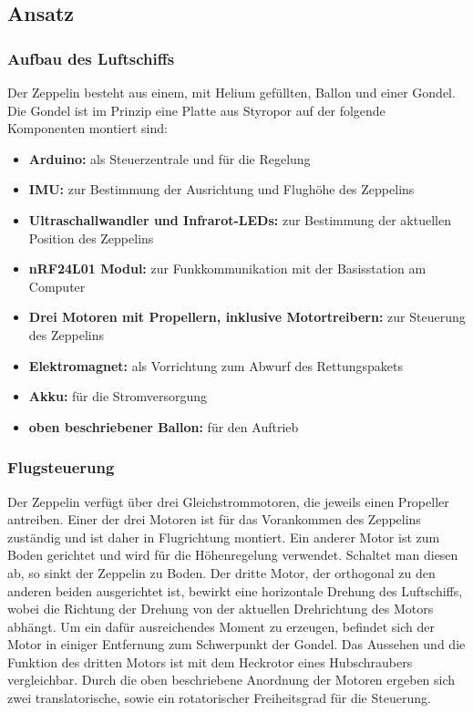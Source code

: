 \documentclass[lang=ngerman,inputenc=utf8,fontsize=10pt]{ldvarticle}
\begin{document}
\subsection*{Ansatz}
\subsubsection*{Aufbau des Luftschiffs}
Der Zeppelin besteht aus einem, mit Helium gefüllten, Ballon und einer Gondel. Die Gondel ist im Prinzip eine Platte aus Styropor auf der folgende Komponenten montiert sind:
\begin{itemize}
\item \textbf{Arduino:} als Steuerzentrale und für die Regelung
\item \textbf{IMU:} zur Bestimmung der Ausrichtung und Flughöhe des Zeppelins 
\item \textbf{Ultraschallwandler und Infrarot-LEDs:} zur Bestimmung der aktuellen Position des Zeppelins
\item \textbf{nRF24L01 Modul:} zur Funkkommunikation mit der Basisstation am Computer
\item \textbf{Drei Motoren mit Propellern, inklusive Motortreibern:} zur Steuerung des Zeppelins
\item \textbf{Elektromagnet:} als Vorrichtung zum Abwurf des Rettungspakets
\item \textbf{Akku:} für die Stromversorgung
\item \textbf{oben beschriebener Ballon:} für den Auftrieb
\end{itemize}

\subsubsection*{Flugsteuerung} 
Der Zeppelin verfügt über drei Gleichstrommotoren, die jeweils einen Propeller antreiben. Einer der drei Motoren ist für das Vorankommen des Zeppelins zuständig und ist daher in Flugrichtung montiert. Ein anderer Motor ist zum Boden gerichtet und wird für die Höhenregelung verwendet. Schaltet man diesen ab, so sinkt der Zeppelin zu Boden. Der dritte Motor, der orthogonal zu den anderen beiden ausgerichtet ist, bewirkt eine horizontale Drehung des Luftschiffs, wobei die Richtung der Drehung von der aktuellen Drehrichtung des Motors abhängt. Um ein dafür ausreichendes Moment zu erzeugen, befindet sich der Motor in einiger Entfernung zum Schwerpunkt der Gondel. Das Aussehen und die Funktion des dritten Motors ist mit dem Heckrotor eines Hubschraubers vergleichbar. Durch die oben beschriebene Anordnung der Motoren ergeben sich zwei translatorische, sowie ein rotatorischer Freiheitsgrad für die Steuerung.
\end{document}
